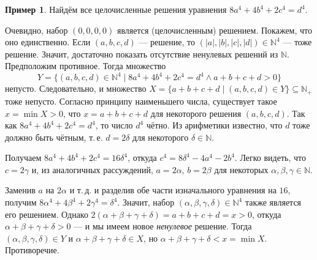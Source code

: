 \documentclass[12pt,notitlepage]{article}
\theoremstyle{plain}
\theoremstyle{definition}
\newtheorem{exm}[thm]{Пример}
\theoremstyle{plain}
\newcommand{\N}{\mathbb{N}}
\newcommand{\sbs}{\subseteq}
\newcommand{\1}{\mathbf{1}}
\newcommand{\0}{\mathbf{0}}
\begin{document}
\begin{exm}
	Найдём все целочисленные решения уравнения $8a^4 + 4b^4 + 2c^4 = d^4$.
	
	Очевидно, набор $(0,0,0,0)$ является (целочисленным) решением. Покажем, что оно единственно. Если $(a,b,c,d)$ --- решение, то $(|a|,|b|,|c|,|d|) \in \N^4$ --- тоже решение. Значит, достаточно показать отсутствие ненулевых решений из $\N$. Предположим противное. Тогда множество
	$$Y = \{ (a,b,c,d) \in \N^4 \mid 8a^4 + 4b^4 + 2c^4 = d^4 \wedge a+b+c+d > 0\}$$
	непусто. Следовательно, и множество $X = \{ a + b + c + d \mid (a,b,c,d) \in Y \} \sbs \N_+$ тоже непусто. Согласно принципу наименьшего числа, существует такое $x = \min X > 0$, что $x = a + b + c +d$ для некоторого решения $(a,b,c,d)$. Так как $8a^4 + 4b^4 + 2c^4 = d^4$, то число $d^4$ чётно. Из арифметики известно, что $d$ тоже должно быть чётным, т.\,е. $d = 2\delta$ для некоторого $\delta \in \N$.
	
	Получаем $8a^4 + 4b^4 + 2c^4 = 16\delta^4$, откуда $c^4 = 8\delta^4 - 4a^4 - 2b^4$. Легко видеть, что $c= 2\gamma$ и, из аналогичных рассуждений, $a = 2\alpha$, $b = 2\beta$ для некоторых $\alpha, \beta, \gamma \in \N$. 
	
	Заменив $a$ на $2\alpha$ и т.\,д. и разделив обе части изначального уравнения на $16$, получим $8\alpha^4 + 4\beta^4 + 2\gamma^4 = \delta^4$.  Значит, набор $(\alpha,\beta,\gamma,\delta) \in \N^4$ также является его решением. Однако $2(\alpha + \beta + \gamma + \delta) = a + b + c + d = x > 0$, откуда $\alpha + \beta + \gamma + \delta > 0$ --- и мы имеем новое \emph{ненулевое} решение. Тогда $(\alpha,\beta,\gamma,\delta) \in Y$ и $\alpha + \beta + \gamma + \delta \in X$, но $\alpha + \beta + \gamma + \delta < x = \min X$. Противоречие.
\end{exm}
\end{document}
